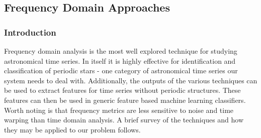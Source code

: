 
	
	\subsection{Frequency Domain Approaches}
	\subsubsection{Introduction}
	Frequency domain analysis is the most well explored technique for studying astronomical time series. In itself it is highly effective for identification and classification of periodic stars - one category of astronomical time series our system needs to deal with. Additionally, the outputs of the various techniques can be used to extract features for time series without periodic structures. These features can then be used in generic feature based machine learning classifiers. Worth noting is that frequency metrics are less sensitive to noise and time warping than time domain analysis. A brief survey of the techniques and how they may be applied to our problem follows.
